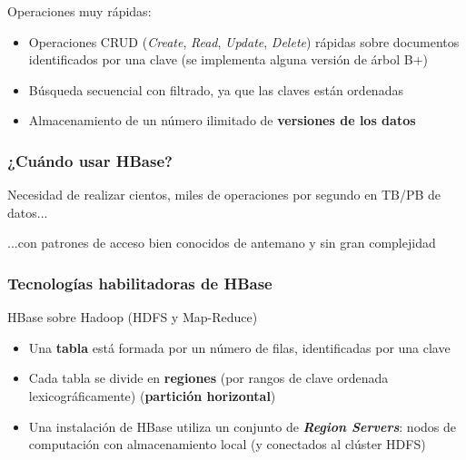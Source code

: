 \documentclass[14pt]{beamer}
\begin{document}
\begin{frame}[allowframebreaks]
\framebreak

 Operaciones muy rápidas:
  \begin{itemize}
  \item Operaciones CRUD ({\em Create}, {\em Read}, {\em Update}, {\em
      Delete}) rápidas sobre documentos identificados por una clave (se
    implementa alguna versión de árbol B+)
\item Búsqueda secuencial con filtrado, ya que las claves están ordenadas
\item Almacenamiento de un número ilimitado de {\bf versiones de los datos}
  \end{itemize}

\end{frame}

\begin{frame}
  \frametitle{¿Cuándo usar HBase?}

  \begin{block}{}
    Necesidad de realizar cientos, miles de operaciones por segundo en
    TB/PB de datos...
  \end{block}

  \begin{block}{}
    ...con patrones de acceso bien conocidos de antemano y sin gran
    complejidad
  \end{block}

\end{frame}

\begin{frame}[allowframebreaks]
  \frametitle{Tecnologías habilitadoras de HBase}
HBase sobre Hadoop (HDFS y Map-Reduce)
\begin{itemize}
\item Una {\bf tabla} está formada por un número de filas, identificadas
  por una clave
\item Cada tabla se divide en {\bf regiones} (por rangos de clave ordenada
  lexicográficamente) ({\bf partición horizontal})
\item Una instalación de HBase utiliza un conjunto de {\bfseries\itshape
    Region Servers}: nodos de computación con almacenamiento local (y
  conectados al clúster HDFS)


\end{itemize}
\end{frame}
\end{document}
